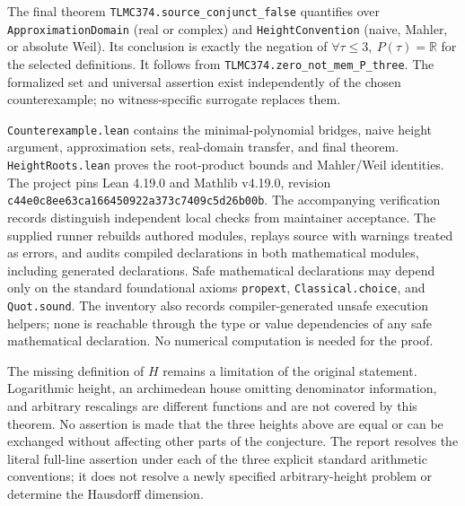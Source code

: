 \documentclass[11pt]{article}
\newcommand{\R}{\mathbb R}
\newcommand{\code}[1]{\nolinkurl{#1}}
\begin{document}
The final theorem \code{TLMC374.source_conjunct_false} quantifies over
\code{ApproximationDomain} (real or complex) and \code{HeightConvention}
(naive, Mahler, or absolute Weil). Its conclusion is exactly the negation of
$\forall\tau\leq3,\ P(\tau)=\R$ for the selected definitions.
It follows from \code{TLMC374.zero_not_mem_P_three}.
The formalized set and universal assertion exist independently of the chosen
counterexample; no witness-specific surrogate replaces them.

\code{Counterexample.lean} contains the minimal-polynomial bridges, naive
height argument, approximation sets, real-domain transfer, and final theorem.
\code{HeightRoots.lean} proves the root-product bounds and Mahler/Weil
identities. The project pins Lean 4.19.0 and Mathlib v4.19.0, revision
\code{c44e0c8ee63ca166450922a373c7409c5d26b00b}.
The accompanying verification records distinguish independent local checks
from maintainer acceptance. The supplied runner rebuilds authored modules,
replays source with warnings treated as errors, and audits compiled
declarations in both mathematical modules, including generated declarations.
Safe mathematical declarations may depend only on the standard foundational
axioms \code{propext}, \code{Classical.choice}, and \code{Quot.sound}.
The inventory also records compiler-generated unsafe execution helpers;
none is reachable through the type or value dependencies of any safe
mathematical declaration. No numerical computation is needed for the proof.

The missing definition of $H$ remains a limitation of the original statement.
Logarithmic height, an archimedean house omitting denominator information,
and arbitrary rescalings are different functions and are not covered by this
theorem. No assertion is made that the three heights above are equal or can
be exchanged without affecting other parts of the conjecture.
The report resolves the literal full-line assertion under each of the three
explicit standard arithmetic conventions; it does not resolve a newly
specified arbitrary-height problem or determine the Hausdorff dimension.
\end{document}
